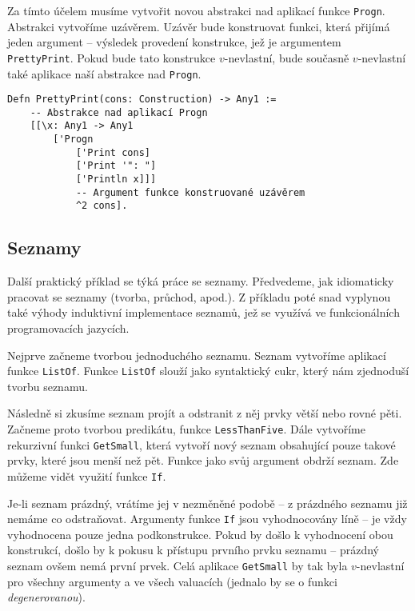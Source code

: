 Za tímto účelem musíme vytvořit novou abstrakci nad aplikací funkce \lstinline{Progn}. Abstrakci
vytvoříme uzávěrem. Uzávěr bude konstruovat funkci, která přijímá jeden argument -- výsledek
provedení konstrukce, jež je argumentem \lstinline{PrettyPrint}. Pokud bude tato konstrukce
$v$-nevlastní, bude současně $v$-nevlastní také aplikace naší abstrakce nad \lstinline{Progn}.

\begin{lstlisting}[caption={Funkce a uzávěry}]
Defn PrettyPrint(cons: Construction) -> Any1 :=
    -- Abstrakce nad aplikací Progn
    [[\x: Any1 -> Any1
        ['Progn
            ['Print cons]
            ['Print '": "]
            ['Println x]]]
            -- Argument funkce konstruované uzávěrem
            ^2 cons].
\end{lstlisting}

\subsection{Seznamy}

Další praktický příklad se týká práce se seznamy. Předvedeme, jak idiomaticky pracovat se seznamy
(tvorba, průchod, apod.). Z příkladu poté snad vyplynou také výhody induktivní implementace
seznamů, jež se využívá ve funkcionálních programovacích jazycích.

Nejprve začneme tvorbou jednoduchého seznamu. Seznam vytvoříme aplikací funkce \lstinline{ListOf}.
Funkce \lstinline{ListOf} slouží jako syntaktický cukr, který nám zjednoduší tvorbu seznamu.

Následně si zkusíme seznam projít a odstranit z něj prvky větší nebo rovné pěti. Začneme proto
tvorbou predikátu, funkce \lstinline{LessThanFive}. Dále vytvoříme rekurzivní funkci
\lstinline{GetSmall}, která vytvoří nový seznam obsahující pouze takové prvky, které jsou menší než
pět. Funkce jako svůj argument obdrží seznam. Zde můžeme vidět využití funkce \lstinline{If}.

Je-li seznam prázdný, vrátíme jej v nezměněné podobě -- z prázdného seznamu již nemáme co
odstraňovat. Argumenty funkce \lstinline{If} jsou vyhodnocovány líně -- je vždy vyhodnocena pouze
jedna podkonstrukce. Pokud by došlo k vyhodnocení obou konstrukcí, došlo by k pokusu k přístupu
prvního prvku seznamu -- prázdný seznam ovšem nemá první prvek. Celá aplikace \lstinline{GetSmall}
by tak byla $v$-nevlastní pro všechny argumenty a ve všech valuacích (jednalo by se o funkci
\textit{degenerovanou}).

